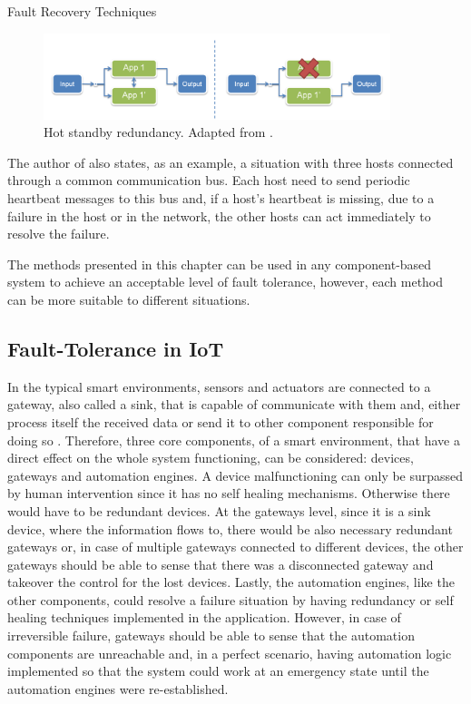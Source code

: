 \begin{Paragraph}{Fault Recovery Techniques}
	\begin{figure}[H]
		\centering
		\includegraphics[width=0.9\textwidth]{figures/hotstandby.png}
		\caption{Hot standby redundancy. Adapted from \cite{Schweiz}.}
		\label{fig:hot_standby}
	\end{figure}
	
	The author of \cite{Schweiz} also states, as an example, a situation with three hosts connected through a common communication bus. Each host need to send periodic heartbeat messages to this bus and, if a host's heartbeat is missing, due to a failure in the host or in the network, the other hosts can act immediately to resolve the failure.
	
\end{Paragraph}

The methods presented in this chapter can be used in any component-based system to achieve an acceptable level of fault tolerance, however, each method can be more suitable to different situations. 

\subsection{Fault-Tolerance in IoT}


In the typical smart environments, sensors and actuators are connected to a gateway, also called a sink, that is capable of communicate with them and, either process itself the received data or send it to other component responsible for doing so \cite{Gia2015}. Therefore, three core components, of a smart environment, that have a direct effect on the whole system functioning, can be considered: devices, gateways and automation engines. A device malfunctioning can only be surpassed by human intervention since it has no self healing mechanisms. Otherwise there would have to be redundant devices. At the gateways level, since it is a sink device, where the information flows to, there would be also necessary redundant gateways or, in case of multiple gateways connected to different devices, the other gateways should be able to sense that there was a disconnected gateway and takeover the control for the lost devices. Lastly, the automation engines, like the other components, could resolve a failure situation by having redundancy or self healing techniques implemented in the application. However, in case of irreversible failure, gateways should be able to sense that the automation components are unreachable and, in a perfect scenario, having automation logic implemented so that the system could work at an emergency state until the automation engines were re-established.


